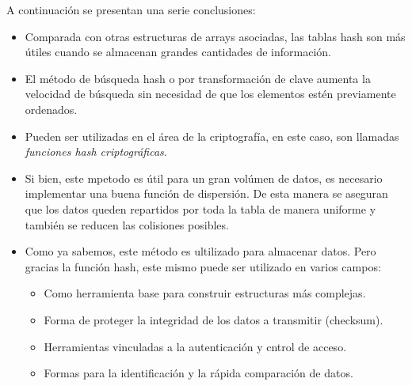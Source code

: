 \documentclass[letterpaper,openright,12pt]{report}
\begin{document}
A continuación se presentan una serie conclusiones:

\begin{itemize}
\itemsep1pt\parskip0pt

\item
Comparada con otras estructuras de arrays asociadas, las tablas hash son más útiles cuando se almacenan grandes cantidades de información.

\item
El método de búsqueda hash o por transformación de clave aumenta la
velocidad de búsqueda sin necesidad de que los elementos estén
previamente ordenados.

\item
Pueden ser utilizadas en el área de la criptografía, en este caso, son llamadas \emph{funciones hash criptográficas}.

\item
Si bien, este mpetodo es útil para un gran volúmen de datos, es necesario implementar una buena función de dispersión. De esta manera se aseguran que los datos queden repartidos por toda la tabla de manera uniforme y también se reducen las colisiones posibles.

\item
Como ya sabemos, este método es ultilizado para almacenar datos. Pero gracias la función hash, este mismo puede ser utilizado en varios campos:
\begin{itemize}
\itemsep1pt\parskip0pt
\item
Como herramienta base para construir estructuras más complejas.
\item
Forma de proteger la integridad de los datos a transmitir (checksum).
\item
Herramientas vinculadas a la autenticación y cntrol de acceso.
\item
Formas para la identificación y la rápida comparación de datos.
\end{itemize}
\end{itemize}
\end{document}
